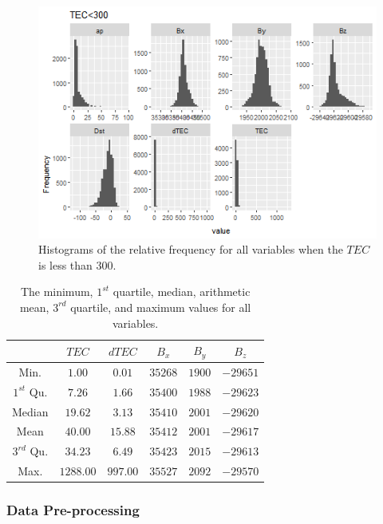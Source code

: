 \documentclass[sn-mathphys-num]{sn-jnl}%
\begin{document}
\begin{figure}
 \centering
 \includegraphics[width=0.9\linewidth]{300TEC_fix.png}
    \caption{Histograms of the relative frequency for all variables when the $TEC$ is less than $300$.}
    \label{fig:300TEC}
\end{figure}

\begin{table}[!ht]
    \centering
    \caption{The minimum, $1^{st}$ quartile, median, arithmetic mean, $3^{rd}$ quartile, and maximum values for all variables.}
    \label{tab:my_label}
    \begin{tabular}{|c|c|c|c|c|c|}
        \hline
        & $TEC$ & $dTEC$ & $B_{x}$ & $B_{y}$ & $B_{z}$ \\ \hline
        Min. & $1.00$ & $0.01$ & $35268$ & $1900$ & $-29651$ \\ \hline
        $1^{st}$ Qu. & $7.26$ & $1.66$ & $35400$ & $1988$ & $-29623$ \\ \hline
        Median & $19.62$ & $3.13$ & $35410$ & $2001$ & $-29620$ \\ \hline
        Mean & $40.00$ & $15.88$ & $35412$ & $2001$ & $-29617$ \\ \hline
        $3^{rd}$ Qu. & $34.23$ & $6.49$ & $35423$ & $2015$ & $-29613$ \\ \hline
        Max. & $1288.00$ & $997.00$ & $35527$ & $2092$ & $-29570$ \\ \hline
    \end{tabular}
\end{table}

\subsubsection{Data Pre-processing}
\end{document}

